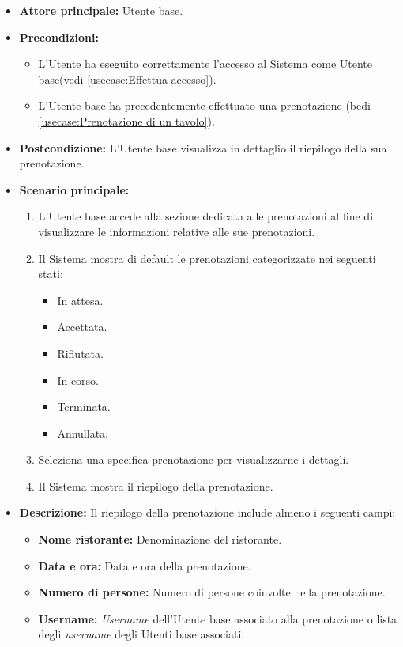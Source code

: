 \label{usecase:Visualizzazione del riepilogo prenotazione}
\begin{itemize}
	\item \textbf{Attore principale:} Utente base.

	\item \textbf{Precondizioni:}
	\begin{itemize}
		\item L'Utente ha eseguito correttamente l'accesso al Sistema come Utente base(vedi \autoref{usecase:Effettua accesso}).
		\item L'Utente base ha precedentemente effettuato una prenotazione (bedi \autoref{usecase:Prenotazione di un tavolo}).
	\end{itemize}


	\item \textbf{Postcondizione:}
	      L'Utente base visualizza in dettaglio il riepilogo della sua prenotazione.

	\item \textbf{Scenario principale:}
	      \begin{enumerate}
		      \item L'Utente base accede alla sezione dedicata alle prenotazioni al fine di visualizzare le informazioni relative alle sue prenotazioni.
		      \item Il Sistema mostra di default le prenotazioni categorizzate nei seguenti stati:
		      \begin{itemize}
                \item In attesa.
                \item Accettata.
                \item Rifiutata.
                \item In corso.
                \item Terminata.
                \item Annullata.
              \end{itemize}
		      \item Seleziona una specifica prenotazione per visualizzarne i dettagli.
		      \item Il Sistema mostra il riepilogo della prenotazione.
	      \end{enumerate}

	\item \textbf{Descrizione:}
		Il riepilogo della prenotazione include almeno i seguenti campi:
	      \begin{itemize}
		      \item \textbf{Nome ristorante:} Denominazione del ristorante.
		      \item \textbf{Data e ora:} Data e ora della prenotazione.
		      \item \textbf{Numero di persone:} Numero di persone coinvolte nella prenotazione.
		      \item \textbf{Username:} \textit{Username} dell'Utente base associato alla prenotazione o lista degli \textit{username} degli Utenti base associati.


\end{itemize}
\end{itemize}

